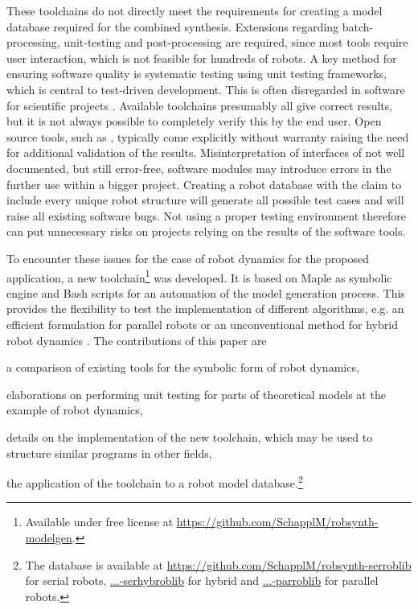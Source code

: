 \documentclass[runningheads]{llncs}
\begin{document}
These toolchains do not directly meet the requirements for creating a model database required for the combined synthesis.
Extensions regarding batch-pro\-ces\-sing, unit-testing and post-processing are required, since most tools require user interaction, which is not feasible for hundreds of robots.
A key method for ensuring software quality is systematic testing using unit testing frameworks, which is central to test-driven development. %
This is often disregarded in software for scientific projects \cite{WilsonAruBroHon2014}.
Available toolchains presumably all give correct results, but it is not always possible to completely verify this by the end user.
Open source tools, such as \cite{SousaCor2012,KhalilVijKhoMuk2014,BethgeMalTsaCal2017}, typically come explicitly without warranty raising the need for additional validation of the results. %
Misinterpretation of interfaces of not well documented, but still error-free, software modules may introduce errors in the further use within a bigger project.
Creating a robot database with the claim to include every unique robot structure will generate all possible test cases and will raise all existing software bugs.
Not using a proper testing environment therefore can put unnecessary risks on projects relying on the results of the software tools.


To encounter these issues for the case of robot dynamics for the proposed application, a new toolchain\footnote{Available under free license at \url{https://github.com/SchapplM/robsynth-modelgen}.} was developed.
It is based on Maple as symbolic engine and Bash scripts for an automation of the model generation process.
This provides the flexibility to test the implementation of different algorithms, e.g. an efficient formulation for parallel robots \cite{AbdellatifHei2009} or an unconventional method for hybrid robot dynamics \cite{SchapplerLilHad2019}. %
The contributions of this paper are
\begin{compactitem}
\item a comparison of existing tools for the symbolic form of robot dynamics,
\item elaborations on performing unit testing for parts of theoretical models at the example of robot dynamics,
\item details on the implementation of the new toolchain, which may be used to structure similar programs in other fields,
\item the application of the toolchain to a robot model database.\footnote{The database is available at \url{https://github.com/SchapplM/robsynth-serroblib} for serial robots, \href{https://github.com/SchapplM/robsynth-serhybroblib}{...-serhybroblib} for hybrid and \href{https://github.com/SchapplM/robsynth-parroblib}{...-parroblib} for parallel robots.}\label{page_with_footnotes}
\end{compactitem}
\end{document}
